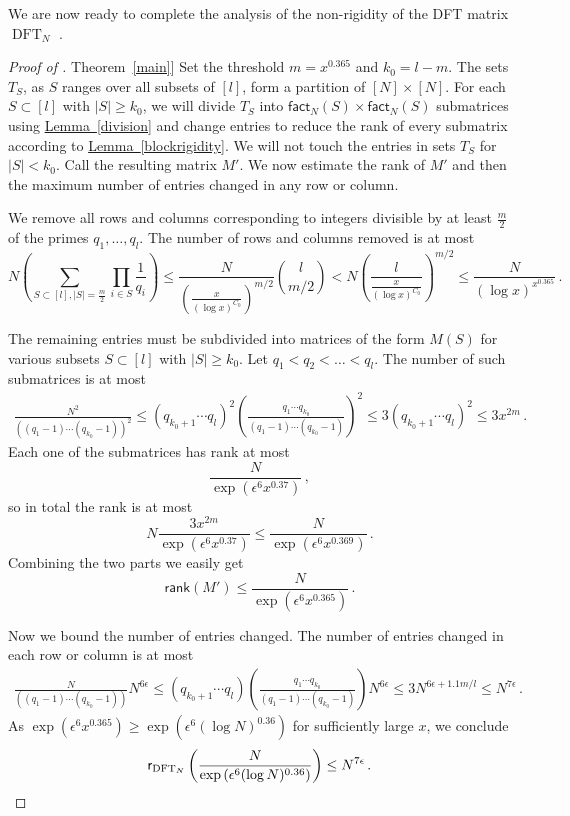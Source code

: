 \documentclass[11pt]{article}
\numberwithin{equation}{section}
\theoremstyle{definition}
\theoremstyle{plain}
\newcommand{\expref}[2]{\hyperref[#2]{#1~\ref{#2}}}
\theoremstyle{definition}
\renewcommand\fact{\textsf{fact}}
\newcommand\rank{\textsf{rank}}
\DeclareMathOperator{\DFT}{DFT}
\begin{document}
We are now ready to complete the analysis of the non-rigidity of the %
DFT %
matrix %
$\DFT_N$ %
.
\begin{proof}[Proof of \expref{Theorem}{main}]
Set the threshold $m = x^{0.365}$ and $k_0 = l -m$.  The sets $T_S$, as $S$ ranges over all subsets of $[l]$, form a partition of $[N] \times [N]$.  For each $S \subset [l]$ with $|S| \geq k_0$, we will divide $T_S$ into $\fact_N(S) \times \fact_N(S)$ submatrices using \expref{Lemma}{division} and change entries to reduce the rank of every submatrix according to \expref{Lemma}{blockrigidity}.  We will not touch the entries in sets $T_S$ for $|S| < k_0$.  Call the resulting matrix $M'$.  We now estimate the rank of $M'$ and then the maximum number of entries changed in any row or column.

We remove all rows and columns corresponding to integers divisible by at least $\frac{m}{2}$ of the primes $q_1, \dots , q_l$.  The number of rows and columns removed is at most
\[
N\left( \sum_{S \subset [l] , |S| = \frac{m}{2}} \prod_{i \in S} \frac{1}{q_i} \right) \leq \frac{N}{\left(\frac{x}{(\log x)^{C_0 }}\right)^{m/2}} \binom{l}{m/2} < N \left(\frac{l}{\frac{x}{(\log x)^{C_0 }}}\right)^{m/2}\leq \frac{N}{(\log x)^{x^{0.365}}} \,.
\]


The remaining entries must be subdivided into matrices of the form $M(S)$ for various subsets $S \subset [l]$ %
with %
%
 $|S| \geq k_0$.  
%
Let   %
 $q_1 < q_2 < \dots < q_l$.  The number of such submatrices is at most 
\[
\begin{multlined}
\frac{N^2}{\left( (q_1-1) \cdots (q_{k_0}-1) \right)^2} \leq (q_{k_0+1} \cdots q_l)^2 \left( \frac{q_1 \cdots q_{k_0}}{(q_1-1) \cdots (q_{k_0}-1)} \right)^2 \leq 3(q_{k_0+1} \cdots q_l)^2 \leq 3x^{2m} \,.
\end{multlined}
\]
Each one of the submatrices has rank at most 
\[
\frac{N}{\exp\left(\epsilon^6 x^{0.37}\right)} \,,
\]
so in total the rank is at most
\[
N\frac{3x^{2m}}{\exp\left(\epsilon^6 x^{0.37}\right)} \leq \frac{N}{\exp\left(\epsilon^6 x^{0.369}\right)} \,.
\]
Combining the two parts we easily get
\[
\rank(M') \leq \frac{N}{\exp\left(\epsilon^6 x^{0.365}\right)} \,.
\]

Now we bound the number of entries changed.  The number of entries changed in each row or column is at most
\[
\begin{multlined}
\frac{N}{\left( (q_1-1) \cdots (q_{k_0}-1) \right)}N^{ 6\epsilon} \leq  (q_{k_0+1} \cdots q_l) \left(\frac{q_1 \cdots q_{k_0}}{(q_1-1) \cdots (q_{k_0}-1)} \right) N^{ 6\epsilon} 
\leq 3N^{6\epsilon + 1.1 m/l} \leq N^{ 7 \epsilon} \,.
\end{multlined}
\]
As $\exp\left(\epsilon^6x^{0.365}\right) \geq \exp\left(\epsilon^6 (\log N)^{0.36}\right)$ for sufficiently large $x$, we conclude
%
%
%
\[
\textsf{r}_{\DFT_N}\left( \frac{N}{\exp\left(\epsilon^6 (\log N)^{0.36}\right)} \right) \leq N^{ 7 \epsilon} \,. \qedhere
\] %
\end{proof}
\end{document}
